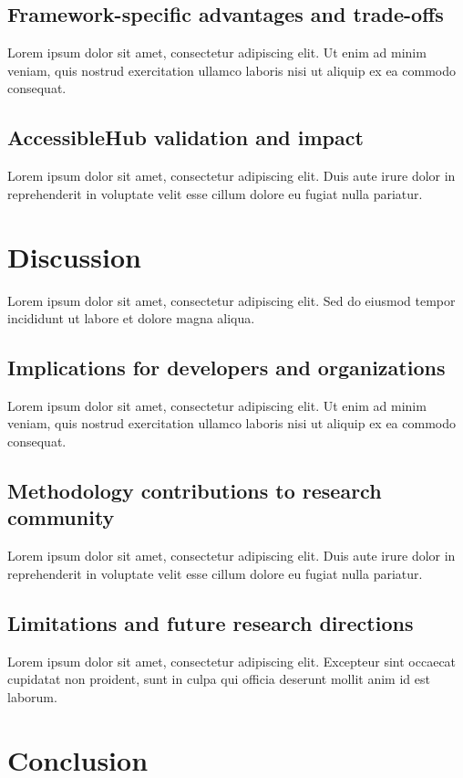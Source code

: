 \documentclass[sigconf]{acmart} %
\begin{document}
\subsection{Framework-specific advantages and trade-offs}
Lorem ipsum dolor sit amet, consectetur adipiscing elit. Ut enim ad minim veniam, quis nostrud exercitation ullamco laboris nisi ut aliquip ex ea commodo consequat.

\subsection{AccessibleHub validation and impact}
Lorem ipsum dolor sit amet, consectetur adipiscing elit. Duis aute irure dolor in reprehenderit in voluptate velit esse cillum dolore eu fugiat nulla pariatur.

\section{Discussion}
\label{sec:discussion}

Lorem ipsum dolor sit amet, consectetur adipiscing elit. Sed do eiusmod tempor incididunt ut labore et dolore magna aliqua.

\subsection{Implications for developers and organizations}
Lorem ipsum dolor sit amet, consectetur adipiscing elit. Ut enim ad minim veniam, quis nostrud exercitation ullamco laboris nisi ut aliquip ex ea commodo consequat.

\subsection{Methodology contributions to research community}
Lorem ipsum dolor sit amet, consectetur adipiscing elit. Duis aute irure dolor in reprehenderit in voluptate velit esse cillum dolore eu fugiat nulla pariatur.

\subsection{Limitations and future research directions}
Lorem ipsum dolor sit amet, consectetur adipiscing elit. Excepteur sint occaecat cupidatat non proident, sunt in culpa qui officia deserunt mollit anim id est laborum.

\section{Conclusion}
\label{sec:conclusion}
\end{document}
